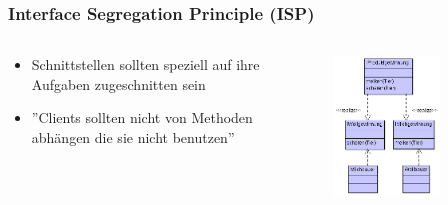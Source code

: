\begin{frame}[fragile]
	\frametitle{Interface Segregation Principle (ISP)}
	\begin{columns}
		\begin{column}{0.5\textwidth}
			\small
			\begin{itemize}
			  \item Schnittstellen sollten speziell auf ihre
			  Aufgaben zugeschnitten sein
			  \item ''Clients sollten nicht von Methoden abh\"angen
			  die sie nicht benutzen''
			\end{itemize}
		\end{column}
		\begin{column}{0.5\textwidth}
			\center
	    	\includegraphics[width=0.6\textwidth,
	    	keepaspectratio=true]{bilder/isp_good.png}
		\end{column}
	\end{columns}
\end{frame}    

